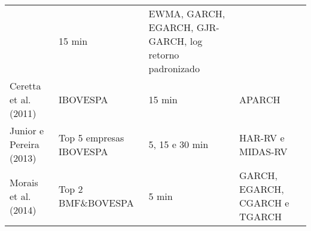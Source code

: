 \documentclass[]{article}
\begin{document}
\begin{longtable}[]{@{}llll@{}}
\begin{minipage}[t]{0.17\columnwidth}
\end{minipage} & \begin{minipage}[t]{0.15\columnwidth}\raggedright\strut
15 min\strut
\end{minipage} & \begin{minipage}[t]{0.23\columnwidth}\raggedright\strut
EWMA, GARCH, EGARCH, GJR-GARCH, log retorno padronizado\strut
\end{minipage}\tabularnewline
\begin{minipage}[t]{0.17\columnwidth}\raggedright\strut
Ceretta et al. (2011)\strut
\end{minipage} & \begin{minipage}[t]{0.17\columnwidth}\raggedright\strut
IBOVESPA\strut
\end{minipage} & \begin{minipage}[t]{0.15\columnwidth}\raggedright\strut
15 min\strut
\end{minipage} & \begin{minipage}[t]{0.23\columnwidth}\raggedright\strut
APARCH\strut
\end{minipage}\tabularnewline
\begin{minipage}[t]{0.17\columnwidth}\raggedright\strut
Junior e Pereira (2013)\strut
\end{minipage} & \begin{minipage}[t]{0.17\columnwidth}\raggedright\strut
Top 5 empresas IBOVESPA\strut
\end{minipage} & \begin{minipage}[t]{0.15\columnwidth}\raggedright\strut
5, 15 e 30 min\strut
\end{minipage} & \begin{minipage}[t]{0.23\columnwidth}\raggedright\strut
HAR-RV e MIDAS-RV\strut
\end{minipage}\tabularnewline
\begin{minipage}[t]{0.17\columnwidth}\raggedright\strut
Morais et al. (2014)\strut
\end{minipage} & \begin{minipage}[t]{0.17\columnwidth}\raggedright\strut
Top 2 BMF\&BOVESPA\strut
\end{minipage} & \begin{minipage}[t]{0.15\columnwidth}\raggedright\strut
5 min\strut
\end{minipage} & \begin{minipage}[t]{0.23\columnwidth}\raggedright\strut
GARCH, EGARCH, CGARCH e TGARCH\strut
\end{minipage}\tabularnewline

\end{longtable}
\end{document}
